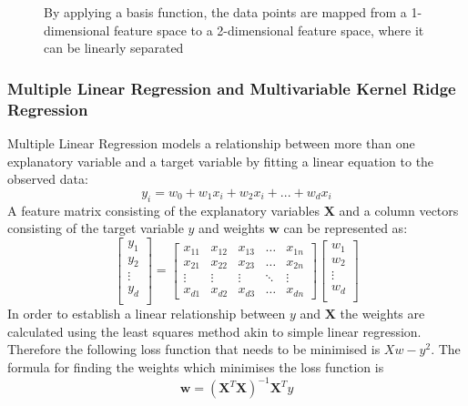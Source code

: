 \documentclass[a4paper,11pt,twoside]{article}
\begin{document}
      \begin{figure}[!htb]
      \captionsetup{justification=centering}
        \caption{\label{fig:my-label}By applying a basis function, the data points are mapped from a 1-dimensional feature space to a 2-dimensional feature space, where it can be linearly separated}
      \end{figure}

\subsubsection{Multiple Linear Regression and Multivariable Kernel Ridge Regression}
Multiple Linear Regression models a relationship between more than one explanatory variable and a target variable by fitting a linear equation to the observed data:
\begin{equation}
y_{i} = w_{0} + w_{1}x_{i} + w_{2}x_{i} +  ... + w_{d}x_{i}
\end{equation}
A feature matrix consisting of the explanatory variables $\textbf{X}$ and a column vectors consisting of the target variable $y$ and weights $\textbf{w}$ can be represented as:
\[
\begin{bmatrix}
	y_{1}\\
	y_{2}\\
	\vdots \\
	y_{d} \\
\end{bmatrix}
= \begin{bmatrix}
    x_{11} & x_{12} & x_{13} & \dots  & x_{1n} \\
    x_{21} & x_{22} & x_{23} & \dots  & x_{2n} \\
    \vdots & \vdots & \vdots & \ddots & \vdots \\
    x_{d1} & x_{d2} & x_{d3} & \dots  & x_{dn}
\end{bmatrix}
\begin{bmatrix}
	w_{1}\\
	w_{2}\\
	\vdots \\
	w_{d} \\
\end{bmatrix}
\]
In order to establish a linear relationship between $y$ and $\textbf{X}$ the weights are calculated using the least squares method akin to simple linear regression. Therefore the following loss function that needs to be minimised is $Xw -y^2$. The formula for finding the weights which minimises the loss function is
\begin{equation}
\textbf{w} = (\textbf{X}^T\textbf{X})^{-1}\textbf{X}^Ty
\end{equation}
\end{document}
